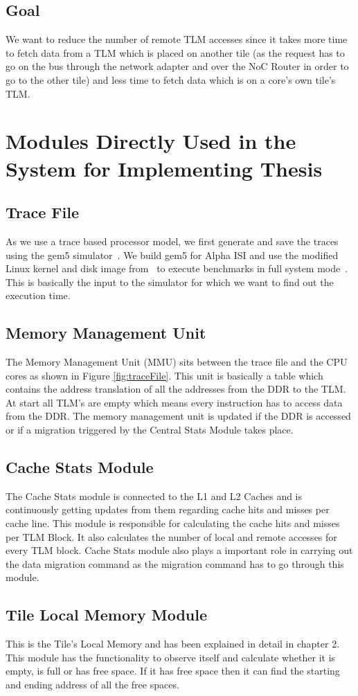 \documentclass{listhesis}
\begin{document}
\subsection{Goal}
We want to reduce the number of remote TLM accesses since it takes more time to fetch data from a TLM which is placed on another tile (as the request has to go on the bus through the network adapter and over the NoC Router in order to go to the other tile) and less time to fetch data which is on a core's own tile's TLM.  
\section{Modules Directly Used in the System for Implementing Thesis}
\subsection{Trace File}
As we use a trace based processor model, we first generate and save the traces using the gem5 simulator~\cite{gem5}. We build gem5 for Alpha ISI and use the modified Linux kernel and disk image from~\cite{trace} to execute benchmarks in full system mode~\cite{lispaper}. This is basically the input to the simulator for which we want to find out the execution time. 
\subsection{Memory Management Unit}
The Memory Management Unit (MMU) sits between the trace file and the CPU cores as shown in Figure \ref{fig:traceFile}. This unit is basically a table which contains the address translation of all the addresses from the DDR to the TLM. At start all TLM's are empty which means every instruction has to access data from the DDR. The memory management unit is updated if the DDR is accessed or if a migration triggered by the Central Stats Module takes place.
\subsection{Cache Stats Module}
The Cache Stats module is connected to the L1 and L2 Caches and is continuously getting updates from them regarding cache hits and misses per cache line. This module is responsible for calculating the cache hits and misses per TLM Block. It also calculates the number of local and remote accesses for every TLM block. Cache Stats module also plays a important role in carrying out the data migration command as the migration command has to go through this module. 
\subsection{Tile Local Memory Module}
This is the Tile's Local Memory and has been explained in detail in chapter 2. This module has the functionality to observe itself and calculate whether it is empty, is full or has free space. If it has free space then it can find the starting and ending address of all the free spaces. 
\end{document}
